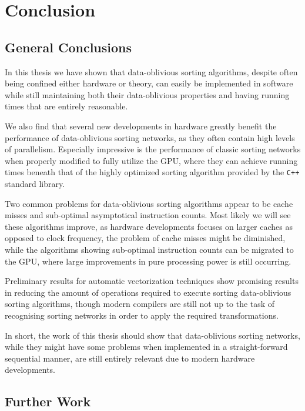 \chapter{Conclusion}
\label{ch:conclusion}

\section{General Conclusions}

In this thesis we have shown that data-oblivious sorting algorithms, despite often being confined either hardware or theory, can easily be implemented in software while still maintaining both their data-oblivious properties and having running times that are entirely reasonable.

We also find that several new developments in hardware greatly benefit the performance of data-oblivious sorting networks, as they often contain high levels of parallelism. Especially impressive is the performance of classic sorting networks when properly modified to fully utilize the GPU, where they can achieve running times beneath that of the highly optimized sorting algorithm provided by the \texttt{C++} standard library.

Two common problems for data-oblivious sorting algorithms appear to be cache misses and sub-optimal asymptotical instruction counts. Most likely we will see these algorithms improve, as hardware developments focuses on larger caches as opposed to clock frequency, the problem of cache misses might be diminished, while the algorithms showing sub-optimal instruction counts can be migrated to the GPU, where large improvements in pure processing power is still occurring.

Preliminary results for automatic vectorization techniques show promising results in reducing the amount of operations required to execute sorting data-oblivious sorting algorithms, though modern compilers are still not up to the task of recognising sorting networks in order to apply the required transformations.

In short, the work of this thesis should show that data-oblivious sorting networks, while they might have some problems when implemented in a straight-forward sequential manner, are still entirely relevant due to modern hardware developments.

\section{Further Work}

